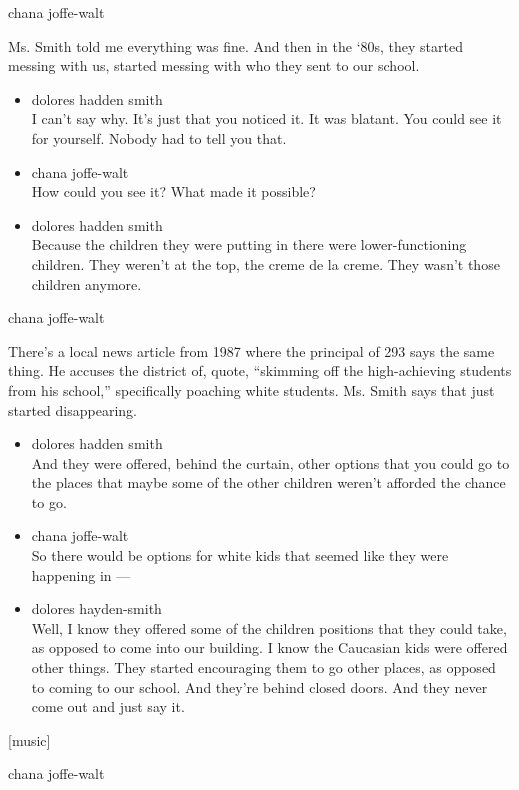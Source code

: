 chana joffe-walt

Ms. Smith told me everything was fine. And then in the `80s, they
started messing with us, started messing with who they sent to our
school.

\begin{itemize}
\item
  dolores hadden smith\\
  I can't say why. It's just that you noticed it. It was blatant. You
  could see it for yourself. Nobody had to tell you that.
\item
  chana joffe-walt\\
  How could you see it? What made it possible?
\item
  dolores hadden smith\\
  Because the children they were putting in there were lower-functioning
  children. They weren't at the top, the creme de la creme. They wasn't
  those children anymore.
\end{itemize}

chana joffe-walt

There's a local news article from 1987 where the principal of 293 says
the same thing. He accuses the district of, quote, ``skimming off the
high-achieving students from his school,'' specifically poaching white
students. Ms. Smith says that just started disappearing.

\begin{itemize}
\item
  dolores hadden smith\\
  And they were offered, behind the curtain, other options that you
  could go to the places that maybe some of the other children weren't
  afforded the chance to go.
\item
  chana joffe-walt\\
  So there would be options for white kids that seemed like they were
  happening in ---
\item
  dolores hayden-smith\\
  Well, I know they offered some of the children positions that they
  could take, as opposed to come into our building. I know the Caucasian
  kids were offered other things. They started encouraging them to go
  other places, as opposed to coming to our school. And they're behind
  closed doors. And they never come out and just say it.
\end{itemize}

{[}music{]}

chana joffe-walt

